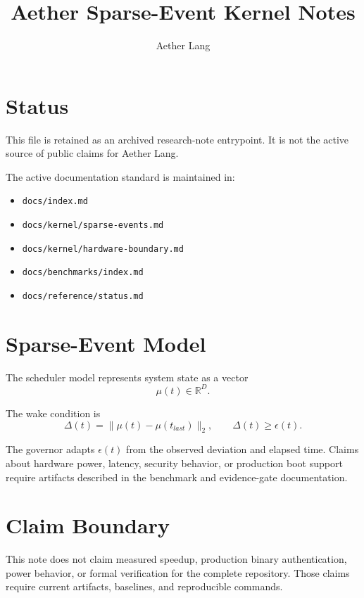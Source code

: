 \documentclass{article}
\title{Aether Sparse-Event Kernel Notes}
\author{Aether Lang}
\date{}
\begin{document}
\maketitle

\section*{Status}

This file is retained as an archived research-note entrypoint. It is not the
active source of public claims for Aether Lang.

The active documentation standard is maintained in:

\begin{itemize}
  \item \texttt{docs/index.md}
  \item \texttt{docs/kernel/sparse-events.md}
  \item \texttt{docs/kernel/hardware-boundary.md}
  \item \texttt{docs/benchmarks/index.md}
  \item \texttt{docs/reference/status.md}
\end{itemize}

\section*{Sparse-Event Model}

The scheduler model represents system state as a vector
\[
  \mu(t) \in \mathbb{R}^D .
\]

The wake condition is
\[
  \Delta(t) = \|\mu(t)-\mu(t_{last})\|_2,
  \qquad
  \Delta(t) \ge \epsilon(t).
\]

The governor adapts \(\epsilon(t)\) from the observed deviation and elapsed
time. Claims about hardware power, latency, security behavior, or production
boot support require artifacts described in the benchmark and evidence-gate
documentation.

\section*{Claim Boundary}

This note does not claim measured speedup, production binary authentication,
power behavior, or formal verification for the complete repository.
Those claims require current artifacts, baselines, and reproducible commands.
\end{document}
